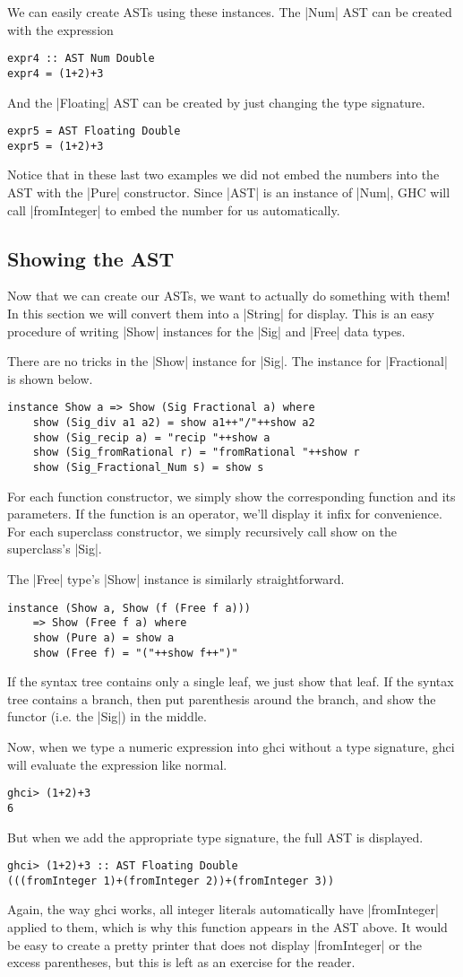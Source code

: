 \documentclass[preprint]{sigplanconf}
\theoremstyle{definition}
\begin{document}
We can easily create ASTs using these instances.
The |Num| AST can be created with the expression
\begin{lstlisting}
expr4 :: AST Num Double
expr4 = (1+2)+3
\end{lstlisting}
And the |Floating| AST can be created by just changing the type signature.
\begin{lstlisting}
expr5 = AST Floating Double
expr5 = (1+2)+3
\end{lstlisting}
Notice that in these last two examples we did not embed the numbers into the AST with the |Pure| constructor.
Since |AST| is an instance of |Num|,
GHC will call |fromInteger| to embed the number for us automatically.

\subsection{Showing the AST}
Now that we can create our ASTs, we want to actually do something with them!
In this section we will convert them into a |String| for display.
This is an easy procedure of writing |Show| instances for the |Sig| and |Free| data types.

There are no tricks in the |Show| instance for |Sig|.
The instance for |Fractional| is shown below.
\begin{lstlisting}
instance Show a => Show (Sig Fractional a) where
    show (Sig_div a1 a2) = show a1++"/"++show a2
    show (Sig_recip a) = "recip "++show a
    show (Sig_fromRational r) = "fromRational "++show r
    show (Sig_Fractional_Num s) = show s
\end{lstlisting}
For each function constructor, we simply show the corresponding function and its parameters.
If the function is an operator, we'll display it infix for convenience.
For each superclass constructor, we simply recursively call show on the superclass's |Sig|.

The |Free| type's |Show| instance is similarly straightforward.
\begin{lstlisting}
instance (Show a, Show (f (Free f a)))
    => Show (Free f a) where
    show (Pure a) = show a
    show (Free f) = "("++show f++")"
\end{lstlisting}
If the syntax tree contains only a single leaf, we just show that leaf.
If the syntax tree contains a branch,
then put parenthesis around the branch,
and show the functor (i.e. the |Sig|) in the middle.

Now, when we type a numeric expression into ghci without a type signature,
ghci will evaluate the expression like normal.
\begin{lstlisting}
ghci> (1+2)+3
6
\end{lstlisting}
But when we add the appropriate type signature,
the full AST is displayed.
\begin{lstlisting}
ghci> (1+2)+3 :: AST Floating Double
(((fromInteger 1)+(fromInteger 2))+(fromInteger 3))
\end{lstlisting}
Again, the way ghci works, all integer literals automatically have |fromInteger| applied to them,
which is why this function appears in the AST above.
It would be easy to create a pretty printer that does not display |fromInteger| or the excess parentheses,
but this is left as an exercise for the reader.
\end{document}
